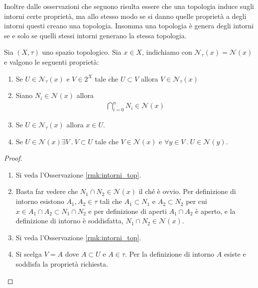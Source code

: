 Inoltre dalle osservazioni che seguono risulta essere che una topologia induce sugli intorni certe proprietà, ma allo stesso modo se si danno quelle proprietà a degli intorni questi creano una topologia. Insomma una topologia è genera degli intorni se e solo se quelli stessi intorni generano la stessa topologia. 

\begin{proposition}
	Sia $(X,\tau)$ uno spazio topologico. Sia $x \in X$, indichiamo con $\mathcal{N}_\tau(x) = \mathcal{N}(x)$ e valgono le seguenti proprietà:
	\begin{enumerate}
		\item Se $U \in \mathcal{N}_\tau(x)$ e $V \in 2^X$ tale che $U \subset V$ allora $V \in \mathcal{N}_\tau(x)$
		\item Siano $N_i \in \mathcal{N}(x)$ allora 
		\begin{equation}
		\begin{aligned}
			\bigcap^{n}_{i=0} N_i \in \mathcal{N}(x)
		\end{aligned}
		\end{equation}
		\item Se $U \in \mathcal{N}_\tau(x)$ allora $x \in U$. 
		\item Se $U \in \mathcal{N}(x) \exists V\ .\ V \subset U$ tale che $V \in \mathcal{N}(x)$ e $\forall y \in V\ .\ U \in \mathcal{N}(y)$.
	\end{enumerate}
\end{proposition}
\begin{proof}
	\begin{enumerate}
		\item Si veda l'Osservazione \ref{rmk:intorni_top}.
		\item Basta far vedere che $N_1 \cap N_2 \in \mathcal{N}(x)$ il ché è ovvio. Per definizione di intorno 
			esistono $A_1, A_2 \in \tau$ tali che $A_1 \subset N_1$ e $A_2 \subset N_2$ per cui $x \in A_1 \cap A_2 \subset N_1 \cap 
			N_2$ e per definizione di aperti $A_1 \cap A_2$ è aperto, e la definizione di intorno è soddisfatta, 
			$N_1 \cap N_2 \in \mathcal{N}(x)$.
		\item Si veda l'Osservazione \ref{rmk:intorni_top}.
		\item Si scelga $V = A$ dove $A \subset U$ e $A \in \tau$. Per la definizione di intorno $A$ esiste e soddisfa la proprietà richiesta. 
	\end{enumerate}
\end{proof}  

